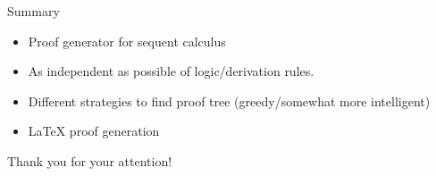 \documentclass{beamer}
\begin{document}
\begin{frame}{Summary}
	\begin{itemize}
		\item Proof generator for sequent calculus
		\item As independent as possible of logic/derivation rules.
		\item Different strategies to find proof tree (greedy/somewhat more intelligent)
		\item LaTeX proof generation
	\end{itemize}

\end{frame}

\begin{frame}[focus]
	Thank you for your attention!
\end{frame}
\end{document}
